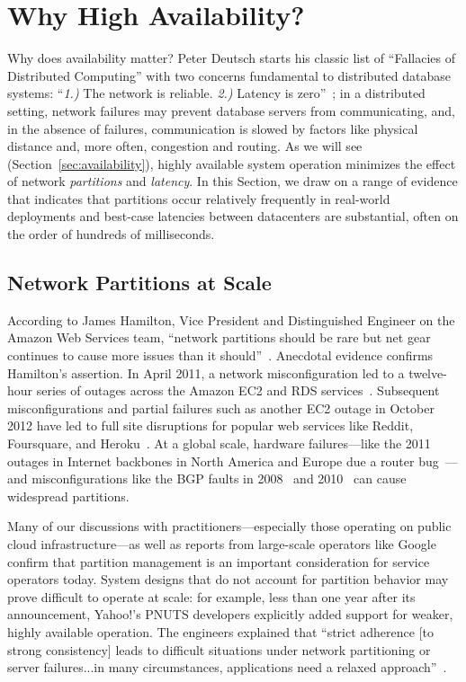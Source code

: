 
\section{Why High Availability?}
\label{sec:motivation}

Why does availability matter? Peter Deutsch starts his classic list of
``Fallacies of Distributed Computing'' with two concerns fundamental
to distributed database systems: ``\textit{1.)}  The network is
reliable. \textit{2.)} Latency is zero''~\cite{fallacies-deutsch}; in
a distributed setting, network failures may prevent database servers
from communicating, and, in the absence of failures, communication is
slowed by factors like physical distance and, more often, congestion
and routing. As we will see (Section~\ref{sec:availability}), highly
available system operation minimizes the effect of network
\textit{partitions} and \textit{latency}. In this Section, we draw on
a range of evidence that indicates that partitions occur relatively
frequently in real-world deployments and best-case latencies between
datacenters are substantial, often on the order of hundreds of
milliseconds.

\subsection{Network Partitions at Scale}

According to James Hamilton, Vice President and Distinguished Engineer
on the Amazon Web Services team, ``network partitions should be rare
but net gear continues to cause more issues than it
should''~\cite{hamilton-partitions}. Anecdotal evidence confirms
Hamilton's assertion. In April 2011, a network misconfiguration led to
a twelve-hour series of outages across the Amazon EC2 and RDS
services~\cite{amazon-netpartition}. Subsequent misconfigurations and
partial failures such as another EC2 outage in October 2012 have led
to full site disruptions for popular web services like Reddit,
Foursquare, and Heroku~\cite{ec2-downsites}. At a global scale,
hardware failures---like the 2011 outages in Internet backbones in
North America and Europe due a router
bug~\cite{juniper-partition}---and misconfigurations like the BGP
faults in 2008~\cite{pakistan-youtube} and
2010~\cite{research-experiment-partition} can cause widespread
partitions.

Many of our discussions with practitioners---especially those
operating on public cloud infrastructure---as well as reports from
large-scale operators like Google~\cite{dean-keynote} confirm that
partition management is an important consideration for service
operators today. System designs that do not account for partition
behavior may prove difficult to operate at scale: for example, less
than one year after its announcement, Yahoo!'s PNUTS developers
explicitly added support for weaker, highly available operation. The
engineers explained that ``strict adherence [to strong consistency]
leads to difficult situations under network partitioning or server
failures...in many circumstances, applications need a relaxed
approach''~\cite{pnuts-update}.


